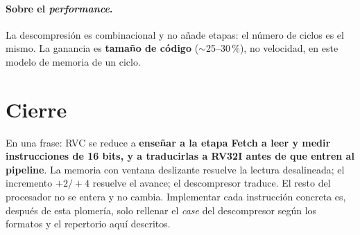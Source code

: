 \documentclass[11pt]{article}
\begin{document}
\paragraph{Sobre el \emph{performance}.} La descompresión es combinacional y no
añade etapas: el número de ciclos es el mismo. La ganancia es \textbf{tamaño de
código} ($\sim$25--30\,\%), no velocidad, en este modelo de memoria de un ciclo.

\section*{Cierre}

En una frase: RVC se reduce a \textbf{enseñar a la etapa Fetch a leer y medir
instrucciones de 16 bits, y a traducirlas a RV32I antes de que entren al
pipeline}. La memoria con ventana deslizante resuelve la lectura desalineada; el
incremento $+2/+4$ resuelve el avance; el descompresor traduce. El resto del
procesador no se entera y no cambia. Implementar cada instrucción concreta es,
después de esta plomería, solo rellenar el \emph{case} del descompresor según los
formatos y el repertorio aquí descritos.
\end{document}
